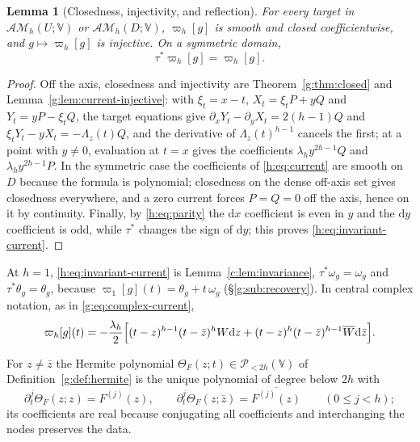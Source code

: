 \documentclass[11pt,a4paper]{article}
\numberwithin{equation}{section}
\newtheorem{lemma}[theorem]{Lemma}
\theoremstyle{definition}
\theoremstyle{remark}
\theoremstyle{plain}
\newcommand{\AM}{\mathcal{AM}}
\newcommand{\om}{\omega}
\newcommand{\thet}{\theta}
\newcommand{\dd}{\mathrm d}
\newcommand{\VV}{\mathbb V}                       %
\newcommand{\PolH}{\mathscr P_{<2h}(\VV)}
\newcommand{\cur}{\varpi}                         %
\newcommand{\Herm}{\Theta}                        %
\newcommand{\Rq}{\Lambda}                         %
\begin{document}
\begin{lemma}[Closedness, injectivity, and reflection]\label{h:lem:current}
For every target in $\AM_h(U;\VV)$ or $\AM_h(D;\VV)$, $\cur_h[g]$ is smooth and
closed coefficientwise, and $g\mapsto\cur_h[g]$ is injective. On a symmetric
domain,
\begin{equation}\label{h:eq:invariant-current}
 \tau^*\cur_h[g]=\cur_h[g].
\end{equation}
\end{lemma}

\begin{proof}
Off the axis, closedness and injectivity are Theorem~\ref{g:thm:closed} and
Lemma~\ref{g:lem:current-injective}: with $\xi_t=x-t$, $X_t=\xi_tP+yQ$ and
$Y_t=yP-\xi_tQ$, the target equations give $\partial_xY_t-\partial_yX_t=2(h-1)Q$
and $\xi_tY_t-yX_t=-\Rq_z(t)Q$, and the derivative of $\Rq_z(t)^{h-1}$ cancels
the first; at a point with $y\ne0$, evaluation at $t=x$ gives the coefficients
$\lambda_hy^{2h-1}Q$ and $\lambda_hy^{2h-1}P$. In the symmetric case the
coefficients of \eqref{h:eq:current} are smooth on $D$ because the formula is
polynomial; closedness on the dense off-axis set gives closedness everywhere,
and a zero current forces $P=Q=0$ off the axis, hence on it by continuity.
Finally, by \eqref{h:eq:parity} the $\dd x$ coefficient is even in $y$ and the
$\dd y$ coefficient is odd, while $\tau^*$ changes the sign of $\dd y$; this
proves \eqref{h:eq:invariant-current}.
\end{proof}

At $h=1$, \eqref{h:eq:invariant-current} is Lemma~\ref{c:lem:invariance},
$\tau^*\om_g=\om_g$ and $\tau^*\thet_g=\thet_g$, because
$\cur_1[g](t)=\thet_g+t\,\om_g$ (\S\ref{g:sub:recovery}). In central complex
notation, as in \eqref{g:eq:complex-current},
\begin{equation}\label{h:eq:complex-current}
 \cur_h[g](t)=-\frac{\lambda_h}{2}\Bigl[(t-z)^{h-1}(t-\bar z)^hW\dd z
 +(t-z)^h(t-\bar z)^{h-1}\overline W\dd\bar z\Bigr].
\end{equation}

For $z\ne\bar z$ the Hermite polynomial $\Herm_F(z;t)\in\PolH$ of
Definition~\ref{g:def:hermite} is the unique polynomial of degree below $2h$ with
\begin{equation}\label{h:eq:Hermite-jets}
 \partial_t^j\Herm_F(z;z)=F^{(j)}(z),\qquad
 \partial_t^j\Herm_F(z;\bar z)=\overline{F^{(j)}(z)}\qquad(0\le j<h);
\end{equation}
its coefficients are real because conjugating all coefficients and
interchanging the nodes preserves the data.
\end{document}
